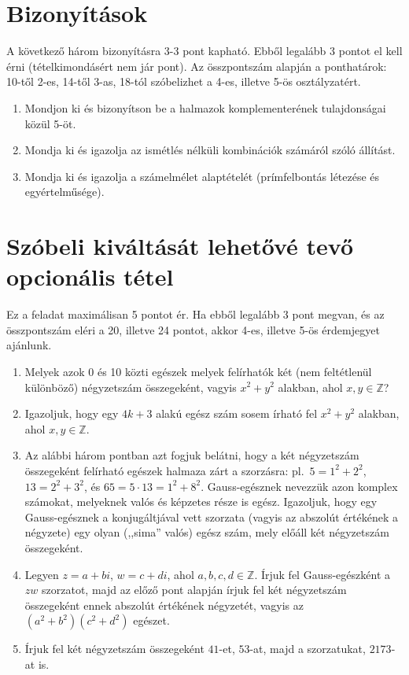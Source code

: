 \documentclass[11pt,a4paper]{article}
\begin{document}
\newpage
\section{Bizonyítások}
A következő három bizonyításra 3-3 pont kapható. Ebből legalább 3 pontot el kell érni (tételkimondásért nem jár pont).
Az összpontszám alapján a ponthatárok: 10-től 2-es, 14-től 3-as, 18-tól szóbelizhet a 4-es, illetve 5-ös osztályzatért.
\begin{enumerate}

\item Mondjon ki és bizonyítson be a halmazok komplementerének tulajdonságai közül 5-öt.
\item Mondja ki és igazolja az ismétlés nélküli kombinációk számáról szóló állítást.
\item Mondja ki és igazolja a számelmélet alaptételét (prímfelbontás létezése és egyértelműsége).

\end{enumerate}


\section{Szóbeli kiváltását lehetővé tevő opcionális tétel}
Ez a feladat maximálisan 5 pontot ér. Ha ebből legalább 3 pont megvan, és az összpontszám eléri a 20, illetve 24 pontot, akkor 4-es, illetve 5-ös érdemjegyet ajánlunk.

\begin{enumerate}

\item Melyek azok 0 és 10 közti egészek melyek felírhatók két (nem feltétlenül különböző) négyzetszám összegeként, vagyis $x^2+y^2$ alakban, ahol $x,y\in\mathbb{Z}$?
\item Igazoljuk, hogy egy $4k+3$ alakú egész szám sosem írható fel $x^2+y^2$ alakban, ahol $x, y\in\mathbb{Z}$.
\item Az alábbi három pontban azt fogjuk belátni, hogy a két négyzetszám összegeként felírható egészek halmaza zárt a szorzásra: pl.\ $5=1^2+2^2$, $13 = 2^2+3^2$, és $65 = 5\cdot 13 = 1^2+8^2$. Gauss-egésznek nevezzük azon komplex számokat, melyeknek valós és képzetes része is egész. Igazoljuk, hogy egy Gauss-egésznek a konjugáltjával vett szorzata (vagyis az abszolút értékének a négyzete) egy olyan (,,sima'' valós) egész szám, mely előáll két négyzetszám összegeként.
\item Legyen $z=a+bi$, $w=c+di$, ahol $a,b,c,d\in\mathbb{Z}$. Írjuk fel Gauss-egészként a $zw$ szorzatot, majd az előző pont alapján írjuk fel két négyzetszám összegeként ennek abszolút értékének négyzetét, vagyis az $(a^2+b^2)(c^2+d^2)$ egészet.
\item Írjuk fel két négyzetszám összegeként $41$-et, $53$-at, majd a szorzatukat, $2173$-at is.


\end{enumerate}
\end{document}
